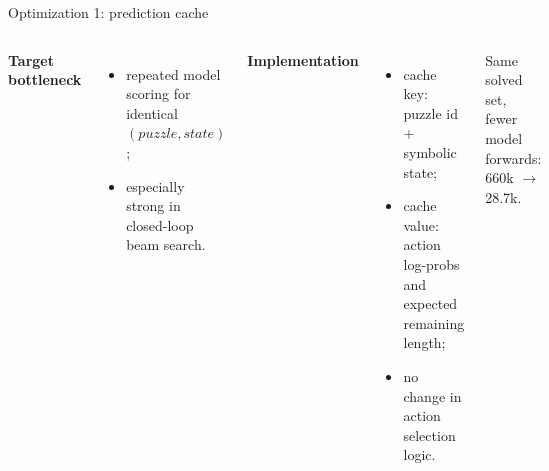 \documentclass[aspectratio=169]{beamer}
\begin{document}
\begin{frame}{Optimization 1: prediction cache}
  \small
  \begin{columns}[T]
    \textbf{Target bottleneck}
    \begin{itemize}
      \item repeated model scoring for identical \((puzzle, state)\);
      \item especially strong in closed-loop beam search.
    \end{itemize}

    \textbf{Implementation}
    \begin{itemize}
      \item cache key: puzzle id + symbolic state;
      \item cache value: action log-probs and expected remaining length;
      \item no change in action selection logic.
    \end{itemize}

    \centering

    \vspace{0.5em}
    \scriptsize
    Same solved set, fewer model forwards: 660k \(\rightarrow\) 28.7k.
  \end{columns}
\end{frame}
\end{document}
